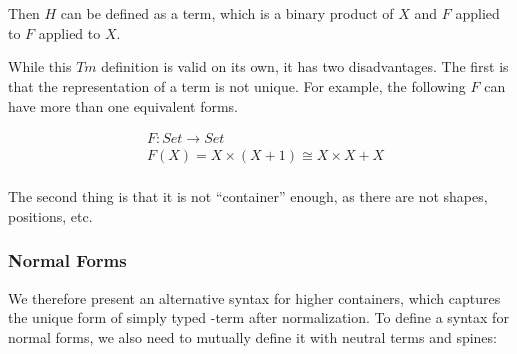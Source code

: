 \begin{code}
\AgdaSpace{}%
\AgdaSpace{}%
\AgdaSpace{}%
\AgdaSpace{}%
\<%
\\
%
\>[2]\AgdaSpace{}%
\AgdaSymbol{:}\AgdaSpace{}%
\AgdaSymbol{(}\AgdaSpace{}%
\AgdaSymbol{:}\AgdaSpace{}%
\AgdaSymbol{)}\AgdaSpace{}%
\AgdaSpace{}%
\AgdaSymbol{(}\AgdaSpace{}%
\AgdaSpace{}%
\AgdaSpace{}%
\AgdaSpace{}%
\AgdaSymbol{)}\AgdaSpace{}%
\AgdaSpace{}%
\AgdaSpace{}%
\AgdaSpace{}%
\<%
\\
%
\>[2]\AgdaSpace{}%
\AgdaSymbol{:}\AgdaSpace{}%
\AgdaSymbol{(}\AgdaSpace{}%
\AgdaSymbol{:}\AgdaSpace{}%
\AgdaSymbol{)}\AgdaSpace{}%
\AgdaSpace{}%
\AgdaSymbol{(}\AgdaSpace{}%
\AgdaSpace{}%
\AgdaSpace{}%
\AgdaSpace{}%
\AgdaSymbol{)}\AgdaSpace{}%
\AgdaSpace{}%
\AgdaSpace{}%
\AgdaSpace{}%
\<%
\end{code}

Then $H$ can be defined as a term, which is a binary product of $X$ and $F$ applied to $F$ applied to $X$. \hyperref[Htm]{\faCog}

While this $Tm$ definition is valid on its own, it has two disadvantages. The first is that the representation of a term is not unique. For example, the following $F$ can have more than one equivalent forms.

\begin{align*}
& F : Set \to Set \\
& F (X) = X \times (X + 1) \cong X \times X + X \\
\end{align*}

The second thing is that it is not ``container'' enough, as there are not shapes, positions, etc.

\subsubsection*{Normal Forms}

We therefore present an alternative syntax for higher containers, which captures the unique form of simply typed \lambda-term after normalization. To define a syntax for normal forms, we also need to mutually define it with neutral terms and spines:

